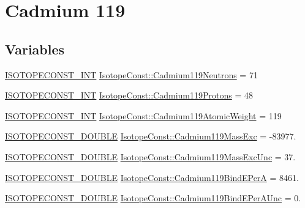\hypertarget{group___isotope_const-_cadmium-_cd119}{}\section{Cadmium 119}
\label{group___isotope_const-_cadmium-_cd119}
\subsection*{Variables}
\begin{DoxyCompactItemize}
\item 
\mbox{\hyperlink{group___isotope_const-_macros_ga5f18360b3e99483a35c32d789e62621c}{I\+S\+O\+T\+O\+P\+E\+C\+O\+N\+S\+T\+\_\+\+I\+NT}} \mbox{\hyperlink{group___isotope_const-_cadmium-_cd119_gae465c6938e59234f8ffcaf78be6d7d0c}{Isotope\+Const\+::\+Cadmium119\+Neutrons}} = 71
\item 
\mbox{\hyperlink{group___isotope_const-_macros_ga5f18360b3e99483a35c32d789e62621c}{I\+S\+O\+T\+O\+P\+E\+C\+O\+N\+S\+T\+\_\+\+I\+NT}} \mbox{\hyperlink{group___isotope_const-_cadmium-_cd119_ga161d3486d59aab7617607dba9b98c9e2}{Isotope\+Const\+::\+Cadmium119\+Protons}} = 48
\item 
\mbox{\hyperlink{group___isotope_const-_macros_ga5f18360b3e99483a35c32d789e62621c}{I\+S\+O\+T\+O\+P\+E\+C\+O\+N\+S\+T\+\_\+\+I\+NT}} \mbox{\hyperlink{group___isotope_const-_cadmium-_cd119_ga698ffcf8f665f41d41ab762780701446}{Isotope\+Const\+::\+Cadmium119\+Atomic\+Weight}} = 119
\item 
\mbox{\hyperlink{group___isotope_const-_macros_ga8f45a7272ce02c0b4c65c44636ed719a}{I\+S\+O\+T\+O\+P\+E\+C\+O\+N\+S\+T\+\_\+\+D\+O\+U\+B\+LE}} \mbox{\hyperlink{group___isotope_const-_cadmium-_cd119_ga26090f8ef5e91f4e7bb318a88b53f607}{Isotope\+Const\+::\+Cadmium119\+Mass\+Exc}} = -\/83977.
\item 
\mbox{\hyperlink{group___isotope_const-_macros_ga8f45a7272ce02c0b4c65c44636ed719a}{I\+S\+O\+T\+O\+P\+E\+C\+O\+N\+S\+T\+\_\+\+D\+O\+U\+B\+LE}} \mbox{\hyperlink{group___isotope_const-_cadmium-_cd119_gaae832edf6a1d9361d4388a72e2a73b58}{Isotope\+Const\+::\+Cadmium119\+Mass\+Exc\+Unc}} = 37.
\item 
\mbox{\hyperlink{group___isotope_const-_macros_ga8f45a7272ce02c0b4c65c44636ed719a}{I\+S\+O\+T\+O\+P\+E\+C\+O\+N\+S\+T\+\_\+\+D\+O\+U\+B\+LE}} \mbox{\hyperlink{group___isotope_const-_cadmium-_cd119_ga3b7b6ad26fa2c415582107cd35192c7a}{Isotope\+Const\+::\+Cadmium119\+Bind\+E\+PerA}} = 8461.
\item 
\mbox{\hyperlink{group___isotope_const-_macros_ga8f45a7272ce02c0b4c65c44636ed719a}{I\+S\+O\+T\+O\+P\+E\+C\+O\+N\+S\+T\+\_\+\+D\+O\+U\+B\+LE}} \mbox{\hyperlink{group___isotope_const-_cadmium-_cd119_ga730ec4cb52dd85592cd6963392438065}{Isotope\+Const\+::\+Cadmium119\+Bind\+E\+Per\+A\+Unc}} = 0.

\end{DoxyCompactItemize}
